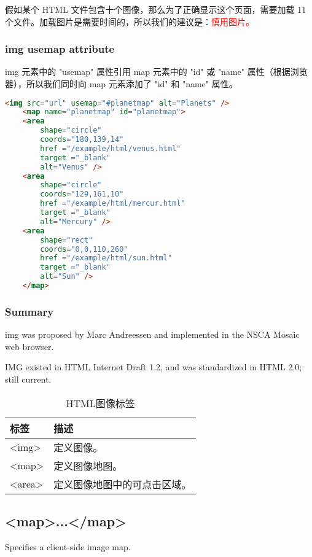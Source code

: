 假如某个 HTML 文件包含十个图像，那么为了正确显示这个页面，需要加载 11 个文件。加载图片是需要时间的，所以我们的建议是：\textcolor{Red}{慎用图片。}

\subsubsection{img usemap attribute}

img 元素中的 "usemap" 属性引用 map 元素中的 "id" 或 "name" 属性（根据浏览器），所以我们同时向 map 元素添加了 "id" 和 "name" 属性。

\begin{lstlisting}[language=HTML]
	<img src="url" usemap="#planetmap" alt="Planets" />
	<map name="planetmap" id="planetmap">
	<area
		shape="circle"
		coords="180,139,14"
		href ="/example/html/venus.html"
		target ="_blank"
		alt="Venus" />
	<area
		shape="circle"
		coords="129,161,10"
		href ="/example/html/mercur.html"
		target ="_blank"
		alt="Mercury" />
	<area
		shape="rect"
		coords="0,0,110,260"
		href ="/example/html/sun.html"
		target ="_blank"
		alt="Sun" />
	</map>
\end{lstlisting}




\subsubsection{Summary}

img was proposed by Marc Andreessen and implemented in the NSCA Mosaic web browser.

IMG existed in HTML Internet Draft 1.2, and was standardized in HTML 2.0; still current.

\begin{table}[!h]
\centering
\caption{HTML图像标签}
\begin{tabular}{|l|l|}
\hline
标签		&描述						\\
\hline
<img>	&定义图像。					\\
\hline
<map>	&定义图像地图。				\\
\hline
<area>	&定义图像地图中的可点击区域。	\\
\hline
\end{tabular}
\end{table}


\subsection{<map>...</map>}

Specifies a client-side image map.

